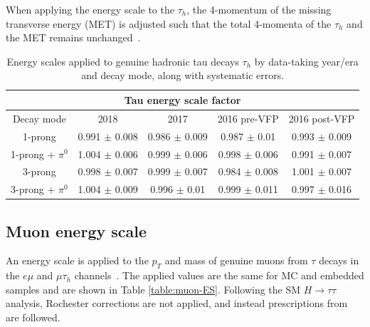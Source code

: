 When applying the energy scale to the $\tau_{h}$, the 4-momentum of the missing transverse energy (MET) is adjusted such that the total 4-momenta of the $\tau_{h}$ and the MET remains unchanged~\cite{twiki_TAU_POG_tauidrecommendationforrun2}.

\begin{table}[ht]
    \centering
    \begin{tabular}{|c|c|c|c|c|}
    \hline
    \multicolumn{5}{|c|}{Tau energy scale factor}                                   \\ \hline
    \hline
    Decay mode        & 2018              & 2017              & 2016 pre-VFP      & 2016 post-VFP     \\ \hline
    1-prong           & 0.991 $\pm$ 0.008 & 0.986 $\pm$ 0.009 & 0.987 $\pm$ 0.01  & 0.993 $\pm$ 0.009 \\
    1-prong + $\pi^0$ & 1.004 $\pm$ 0.006 & 0.999 $\pm$ 0.006 & 0.998 $\pm$ 0.006 & 0.991 $\pm$ 0.007 \\
    3-prong           & 0.998 $\pm$ 0.007 & 0.999 $\pm$ 0.007 & 0.984 $\pm$ 0.008 & 1.001 $\pm$ 0.007 \\
    3-prong + $\pi^0$ & 1.004 $\pm$ 0.009 & 0.996 $\pm$ 0.01  & 0.999 $\pm$ 0.011 & 0.997 $\pm$ 0.016 \\ \hline
    \end{tabular}
    \caption{Energy scales applied to genuine hadronic tau decays $\tau_{h}$ by data-taking year/era and decay mode, along with systematic errors.}
    \label{table:tau-ES}
\end{table}

\subsection{Muon energy scale}
\label{sec:muon_energy_scale}

An energy scale is applied to the $p_{T}$ and mass of genuine muons from $\tau$ decays in the $e\mu$ and $\mu\tau_{h}$ channels~\cite{twiki_MUON_POG_recommendation}. The applied values are the same for MC and embedded samples and are shown in Table \ref{table:muon-ES}. Following the SM $H \rightarrow \tau\tau$ analysis, Rochester corrections are not applied, and instead prescriptions from~\cite{twiki_MUO_simplified_ES} are followed.


